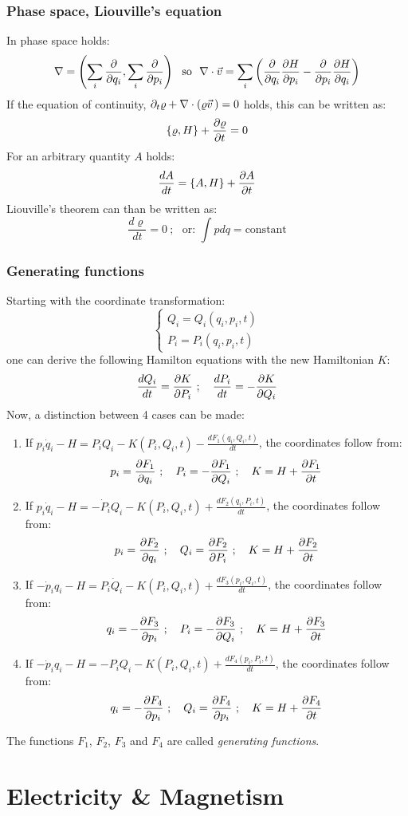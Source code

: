 \subsection{Phase space, Liouville's equation}
In phase space holds:
\[
\nabla=\left(\sum_i\frac{\partial }{\partial q_i},\sum_i\frac{\partial }{\partial p_i}\right)\mbox{~~so~~}
\nabla\cdot\vec{v}=\sum_i\left(\frac{\partial }{\partial q_i}\frac{\partial H}{\partial p_i}-\frac{\partial }{\partial p_i}\frac{\partial H}{\partial q_i}\right)
\]
If the equation of continuity, $\partial_t\varrho+\nabla\cdot(\varrho\vec{v}\,)=0$
holds, this can be written as:
\[
\{\varrho,H\}+\frac{\partial \varrho}{\partial t}=0
\]
For an arbitrary quantity $A$ holds:
\[
\frac{dA}{dt}=\{A,H\}+\frac{\partial A}{\partial t}
\]
Liouville's theorem can than be written as:
\[
\frac{d\varrho}{dt}=0~;~~~\mbox{or:~}\int pdq=\mbox{constant}
\]
\subsection{Generating functions}
Starting with the coordinate transformation:
\[
\left\{\begin{array}{l}
Q_i=Q_i(q_i,p_i,t)\\
P_i=P_i(q_i,p_i,t)
\end{array}\right.
\]
one can derive the following Hamilton equations with the new Hamiltonian $K$:
\[
\frac{dQ_i}{dt}=\frac{\partial K}{\partial P_i}~;~~~\frac{dP_i}{dt}=-\frac{\partial K}{\partial Q_i}
\]
Now, a distinction between 4 cases can be made:
\begin{enumerate}
\item If $\displaystyle p_i\dot{q}_i-H=P_iQ_i-K(P_i,Q_i,t)-\frac{dF_1(q_i,Q_i,t)}{dt}$,
the coordinates follow from:
\[
p_i=\frac{\partial F_1}{\partial q_i}~;~~~P_i=-\frac{\partial F_1}{\partial Q_i}~;~~~K=H+\frac{\partial F_1}{\partial t}
\]
\item If $\displaystyle p_i\dot{q}_i-H=-\dot{P}_iQ_i-K(P_i,Q_i,t)+\frac{dF_2(q_i,P_i,t)}{dt}$,
the coordinates follow from:
\[
p_i=\frac{\partial F_2}{\partial q_i}~;~~~Q_i=\frac{\partial F_2}{\partial P_i}~;~~~K=H+\frac{\partial F_2}{\partial t}
\]
\item If $\displaystyle-\dot{p}_iq_i-H=P_i\dot{Q}_i-K(P_i,Q_i,t)+\frac{dF_3(p_i,Q_i,t)}{dt}$,
the coordinates follow from:
\[
q_i=-\frac{\partial F_3}{\partial p_i}~;~~~P_i=-\frac{\partial F_3}{\partial Q_i}~;~~~K=H+\frac{\partial F_3}{\partial t}
\]
\item If $\displaystyle-\dot{p}_iq_i-H=-P_iQ_i-K(P_i,Q_i,t)+\frac{dF_4(p_i,P_i,t)}{dt}$,
the coordinates follow from:
\[
q_i=-\frac{\partial F_4}{\partial p_i}~;~~~Q_i=\frac{\partial F_4}{\partial p_i}~;~~~K=H+\frac{\partial F_4}{\partial t}
\]
\end{enumerate}
The functions $F_1$, $F_2$, $F_3$ and $F_4$ are called {\it generating functions}.

\chapter{Electricity \& Magnetism}
